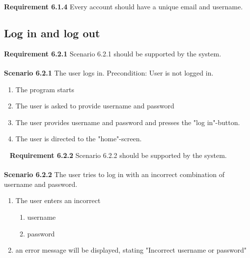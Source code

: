 \documentclass{article}
\begin{document}
\textbf{Requirement 6.1.4} Every account should have a unique email and username.

\subsection{Log in and log out}
\textbf{Requirement 6.2.1} Scenario 6.2.1 should be supported by the system.
\\ \\
\textbf{Scenario 6.2.1} The user logs in. Precondition: User is not logged in. 
\begin{enumerate}
    \item The program starts
    \item The user is asked to provide username and password
    \item The user provides username and password and presses the "log in"-button.
    \item The user is directed to the "home"-screen.
\end{enumerate}
\mbox{}\
\textbf{Requirement 6.2.2} Scenario 6.2.2 should be supported by the system.
\\ \\
\textbf{Scenario 6.2.2} The user tries to log in with an incorrect combination of username and password.
\begin{enumerate}
    \item The user enters an incorrect
    \begin{enumerate}[label=(\alph*)]
        \item username
        \item password
    \end{enumerate}
    \item an error message will be displayed, stating "Incorrect username or password"
\end{enumerate}
\\ \\
\end{document}
